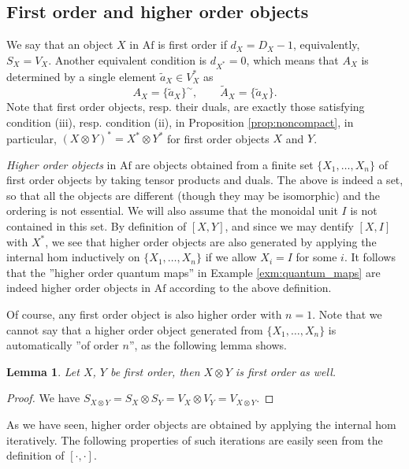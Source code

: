 \documentclass[12pt]{article}
\newtheorem{lemma}{Lemma}
\theoremstyle{definition}
\theoremstyle{remark}
\def \Af{\mathrm{Af}}
\begin{document}
\subsection{First order and higher order objects}


We say that an object $X$ in $\Af$ is first order if $d_X=D_X-1$, equivalently, $S_X=V_X$.
Another equivalent condition is $d_{X^*}=0$, which means that $A_X$ is determined by a
single element $\tilde a_X\in V_X^*$ as 
\[
A_X=\{\tilde a_X\}^\sim,\qquad \tilde A_X=\{\tilde a_X\}.
\]
Note that first order objects, resp. their duals, are exactly those satisfying
condition (iii), resp. condition (ii), in Proposition \ref{prop:noncompact}, in
particular, $(X\otimes Y)^*=X^*\otimes Y^*$ for first order objects $X$ and $Y$.


{\em Higher order objects} in $\Af$ are objects  obtained from a finite set $\{X_1,\dots,X_n\}$ of first order objects by
taking tensor products and duals. The above is indeed a set, so that all the objects are
different (though they may be isomorphic) and the ordering is not essential. We will also
assume that the monoidal  unit $I$ is not contained in this set. By definition of $[X,Y]$, and since we may dentify $[X,I]$ with $X^*$, we see that higher order objects are
also generated by applying the internal hom inductively on $\{X_1,\dots, X_n\}$ if we allow $X_i=I$ for some  
$i$. It follows that the ''higher order quantum maps'' in Example \ref{exm:quantum_maps}
are indeed higher order objects in $\Af$  according to the above definition.


Of course, any first order
object is also higher order with $n=1$. Note that we cannot say that a higher order object
generated from $\{X_1,\dots, X_n\}$ is automatically ''of order $n$'', as the following lemma shows. 

\begin{lemma}\label{lemma:1ordertensor} Let $X$, $Y$ be first order, then $X\otimes Y$ is
first order as well.

\end{lemma}

\begin{proof} We have $S_{X\otimes Y}=S_X\otimes S_Y=V_X\otimes V_Y=V_{X\otimes Y}$.

\end{proof}

As we have seen, higher order objects are obtained by applying the internal hom
iteratively. The following properties of such iterations are easily seen from the
definition of $[\cdot,\cdot]$. 
\end{document}
